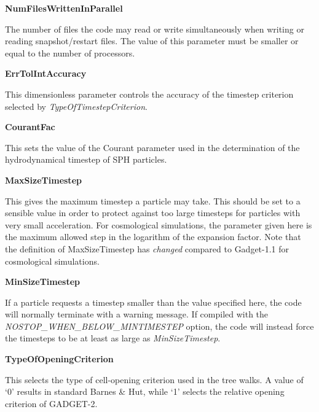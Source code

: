 \begin{DoxyItemize}
\item {\bfseries NumFilesWrittenInParallel} \par
 The number of files the code may read or write simultaneously when writing or reading snapshot/restart files. The value of this parameter must be smaller or equal to the number of processors.
\end{DoxyItemize}


\begin{DoxyItemize}
\item {\bfseries ErrTolIntAccuracy} \par
 This dimensionless parameter controls the accuracy of the timestep criterion selected by {\itshape TypeOfTimestepCriterion\/}.
\end{DoxyItemize}


\begin{DoxyItemize}
\item {\bfseries CourantFac} \par
 This sets the value of the Courant parameter used in the determination of the hydrodynamical timestep of SPH particles.
\end{DoxyItemize}


\begin{DoxyItemize}
\item {\bfseries MaxSizeTimestep} \par
 This gives the maximum timestep a particle may take. This should be set to a sensible value in order to protect against too large timesteps for particles with very small acceleration. For cosmological simulations, the parameter given here is the maximum allowed step in the logarithm of the expansion factor. Note that the definition of MaxSizeTimestep has {\itshape changed\/} compared to Gadget-\/1.1 for cosmological simulations.
\end{DoxyItemize}


\begin{DoxyItemize}
\item {\bfseries MinSizeTimestep} \par
 If a particle requests a timestep smaller than the value specified here, the code will normally terminate with a warning message. If compiled with the {\itshape NOSTOP\_\-WHEN\_\-BELOW\_\-MINTIMESTEP\/} option, the code will instead force the timesteps to be at least as large as {\itshape MinSizeTimestep\/}.
\end{DoxyItemize}


\begin{DoxyItemize}
\item {\bfseries TypeOfOpeningCriterion} \par
 This selects the type of cell-\/opening criterion used in the tree walks. A value of `0' results in standard Barnes \& Hut, while `1' selects the relative opening criterion of GADGET-\/2.
\end{DoxyItemize}



